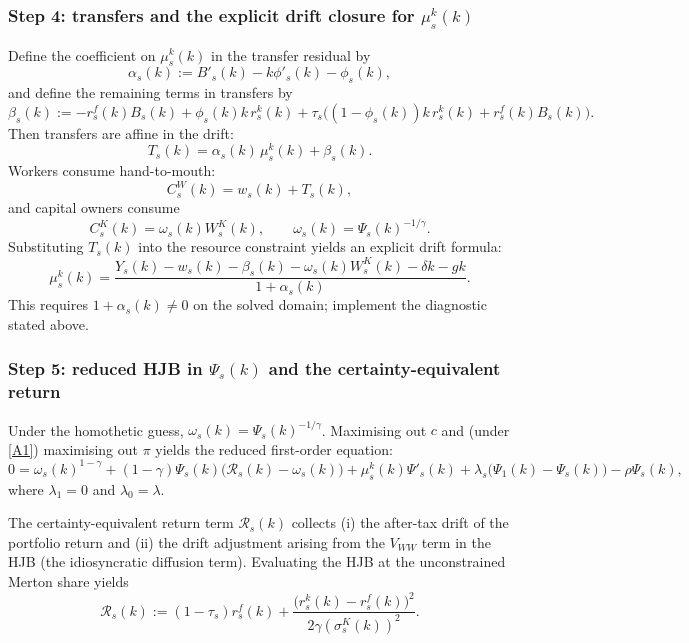 \documentclass{article}
\begin{document}
\subsubsection{Step 4: transfers and the explicit drift closure for $\mu^k_s(k)$}
Define the coefficient on $\mu^k_s(k)$ in the transfer residual by
\begin{equation}
\alpha_s(k) := B'_s(k) - k\phi'_s(k) - \phi_s(k),
\tag{52}
\end{equation}
and define the remaining terms in transfers by
\begin{equation}
\beta_s(k)
:=
- r^f_s(k)B_s(k)
+ \phi_s(k)k\,r^k_s(k)
+ \tau_s\Big((1-\phi_s(k))k\,r^k_s(k) + r^f_s(k)B_s(k)\Big).
\tag{53}
\end{equation}
Then transfers are affine in the drift:
\begin{equation}
T_s(k)=\alpha_s(k)\,\mu^k_s(k)+\beta_s(k).
\tag{54}
\end{equation}
Workers consume hand-to-mouth:
\[
C^W_s(k)=w_s(k)+T_s(k),
\]
and capital owners consume
\[
C^K_s(k)=\omega_s(k)W^K_s(k),\qquad \omega_s(k)=\Psi_s(k)^{-1/\gamma}.
\]
Substituting $T_s(k)$ into the resource constraint yields an explicit drift formula:
\begin{equation}
\mu^k_s(k)
=
\frac{
Y_s(k) - w_s(k) - \beta_s(k) - \omega_s(k)W^K_s(k) - \delta k - gk
}{
1+\alpha_s(k)
}.
\tag{55}
\end{equation}
This requires $1+\alpha_s(k)\neq 0$ on the solved domain; implement the diagnostic stated above.

\subsubsection{Step 5: reduced HJB in $\Psi_s(k)$ and the certainty-equivalent return}
Under the homothetic guess, $\omega_s(k)=\Psi_s(k)^{-1/\gamma}$. Maximising out $c$ and (under \eqref{A1})
maximising out $\pi$ yields the reduced first-order equation:
\begin{equation}
0
=
\omega_s(k)^{1-\gamma}
+
(1-\gamma)\Psi_s(k)\Big(\mathcal{R}_s(k)-\omega_s(k)\Big)
+
\mu^k_s(k)\Psi'_s(k)
+
\lambda_s\big(\Psi_1(k)-\Psi_s(k)\big)
-
\rho \Psi_s(k),
\tag{56}
\end{equation}
where $\lambda_1=0$ and $\lambda_0=\lambda$.

The certainty-equivalent return term $\mathcal R_s(k)$ collects (i) the after-tax drift of the portfolio
return and (ii) the drift adjustment arising from the $V_{WW}$ term in the HJB (the idiosyncratic diffusion
term). Evaluating the HJB at the unconstrained Merton share yields
\begin{equation}
\mathcal{R}_s(k)
:=
(1-\tau_s)r^f_s(k)
+
\frac{\big(r^k_s(k)-r^f_s(k)\big)^2}{2\gamma(\sigma^K_s(k))^2}.
\tag{57}
\end{equation}
\end{document}

